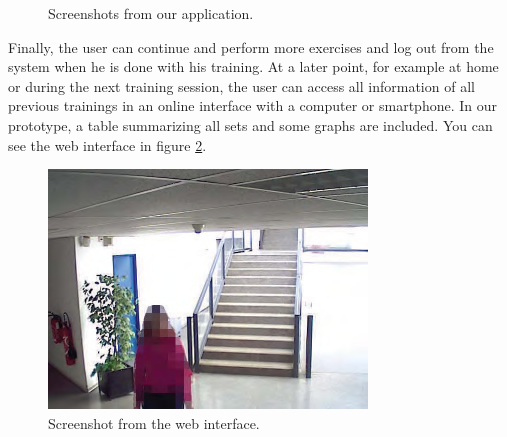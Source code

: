 \documentclass{tk3-team}
\begin{document}
\begin{figure}[!t]
\hfil
{}
\hfil
{}
\caption{Screenshots from our application.}
\label{fig_screenshots}
\end{figure}

Finally, the user can continue and perform more exercises and log out from the system when he is done with his training. At a later point, for example at home or during the next training session, the user can access all information of all previous trainings in an online interface with a computer or smartphone. In our prototype, a table summarizing all sets and some graphs are included. You can see the web interface in figure \ref{fig_web_screenshot}. %

\begin{figure}[!t]
\centering
\includegraphics[width=\textwidth]{img/sth}
\caption{Screenshot from the web interface. %
}
\label{fig_web_screenshot}
\end{figure}
\end{document}

